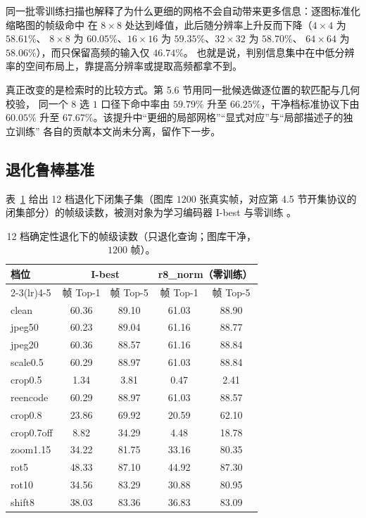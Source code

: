 同一批零训练扫描也解释了为什么更细的网格不会自动带来更多信息：逐图标准化缩略图的帧级命中
在 $8\times8$ 处达到峰值，此后随分辨率上升反而下降（$4\times4$ 为 $58.61\%$、
$8\times8$ 为 $60.05\%$、$16\times16$ 为 $59.35\%$、$32\times32$ 为 $58.70\%$、
$64\times64$ 为 $58.06\%$），而只保留高频的输入仅 $46.74\%$。
也就是说，判别信息集中在中低分辨率的空间布局上，靠提高分辨率或提取高频都拿不到。

真正改变的是检索时的比较方式。第 5.6 节用同一批候选做逐位置的软匹配与几何校验，
同一个 $8$ 选 $1$ 口径下命中率由 $59.79\%$ 升至 $66.25\%$，干净档标准协议下由
$60.05\%$ 升至 $67.67\%$。该提升中“更细的局部网格”“显式对应”与“局部描述子的独立训练”
各自的贡献本文尚未分离，留作下一步。

\subsection{退化鲁棒基准}
\label{sec:degrade-exp}

表~\ref{tab:degrade} 给出 12 档退化下闭集子集（图库 $1200$ 张真实帧，对应第 4.5 节开集协议的
闭集部分）的帧级读数，被测对象为学习编码器 I-best 与零训练 。

\begin{table}[t]
\centering
\caption{12 档确定性退化下的帧级读数（只退化查询；图库干净，$1200$ 帧）。}
\label{tab:degrade}
\small
\begin{tabular}{lcccc}
\toprule
\multirow{2}{*}{档位} & \multicolumn{2}{c}{I-best} & \multicolumn{2}{c}{r8\_norm（零训练）} \\
\cmidrule(lr){2-3}\cmidrule(lr){4-5}
 & 帧 Top-1 & 帧 Top-5 & 帧 Top-1 & 帧 Top-5 \\
\midrule
clean      & 60.36 & 89.10 & 61.03 & 88.90 \\
jpeg50     & 60.23 & 89.04 & 61.16 & 88.77 \\
jpeg20     & 60.36 & 88.57 & 61.16 & 88.84 \\
scale0.5   & 60.29 & 88.97 & 61.03 & 88.84 \\
crop0.5    & 1.34  & 3.81  & 0.47  & 2.41 \\
reencode   & 60.29 & 88.97 & 61.03 & 88.57 \\
\midrule
crop0.8    & 23.86 & 69.92 & 20.59 & 62.10 \\
crop0.7off & 8.82  & 34.29 & 4.48  & 18.78 \\
zoom1.15   & 34.22 & 81.75 & 33.16 & 80.35 \\
rot5       & 48.33 & 87.10 & 44.92 & 87.30 \\
rot10      & 34.56 & 83.29 & 30.88 & 80.95 \\
shift8     & 38.03 & 83.36 & 36.83 & 83.09 \\
\bottomrule
\end{tabular}
\end{table}

